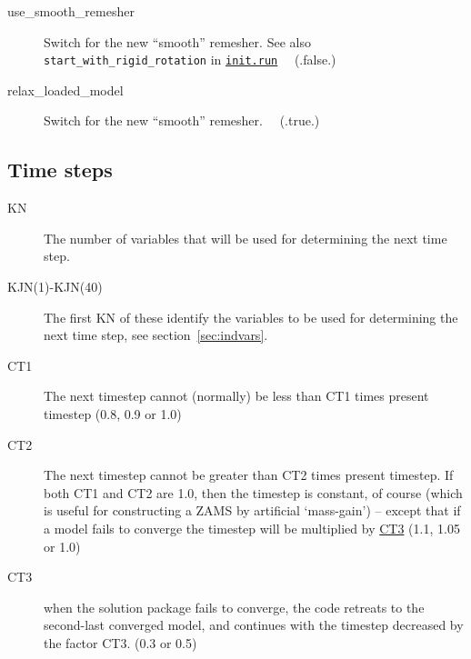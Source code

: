 \begin{description}
\item[use\_smooth\_remesher]\hypertarget{use_smooth_remesher}{} Switch for the new ``smooth'' remesher.  See also \texttt{start\_with\_rigid\_rotation} in \hyperlink{initrun}{\texttt{init.run}} \ \  (.false.)
\item[relax\_loaded\_model]\hypertarget{relax_loaded_model}{} Switch for the new ``smooth'' remesher.   \ \  (.true.)
\end{description}





\subsection{Time steps}
\label{sec:initdat:timestep}

\begin{description}
\item[KN]\hypertarget{kn}{} The number of variables that will be used for determining the next time step.
\end{description}



\begin{description}
\item[KJN(1)-KJN(40)]\hypertarget{kjn}{} The first KN of these identify the variables to be used for determining the next time step, see section~\ref{sec:indvars}.
\end{description}




\begin{description}
\item[CT1]\hypertarget{ct1}{} The next timestep cannot (normally) be less than CT1 times present timestep (0.8, 0.9 or 1.0)
\item[CT2]\hypertarget{ct2}{} The next timestep cannot be greater than CT2 times present timestep.
  If both CT1 and CT2 are 1.0, then the timestep is constant, of course (which is useful for constructing a ZAMS by 
  artificial `mass-gain') -- except that if a model fails to converge the timestep will be multiplied by \hyperlink{ct3}{CT3}  (1.1, 1.05 or 1.0)
\item[CT3]\hypertarget{ct3}{} when the solution package fails to converge, the code retreats to the second-last converged model, and continues 
  with the timestep decreased by the factor CT3. (0.3 or 0.5)
\end{description}





